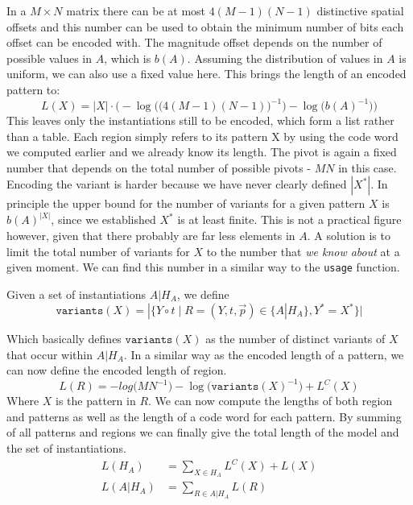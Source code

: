 \documentclass{llncs}
\begin{document}
In a $M\times N$ matrix there can be at most $4(M-1)(N-1)$ distinctive spatial offsets and this number can be used to obtain the minimum number of bits each offset can be encoded with. The magnitude offset depends on the number of possible values in $A$, which is $b(A)$. Assuming the distribution of values in $A$ is uniform, we can also use a fixed value here. This brings the length of an encoded pattern to:
$$
L(X)= |X| \cdot \bigg(-\log\Big(\big(4(M-1)(N-1)\big)^{-1}\Big) -\log\Big(b(A)^{-1}\Big)\bigg)
$$
This leaves only the instantiations still to be encoded, which form a list rather than a table. Each region simply refers to its pattern X by using the code word we computed earlier and we already know its length. The pivot is again a fixed number that depends on the total number of possible pivots - $MN$ in this case. Encoding the variant is harder because we have never clearly defined $|X^*|$. In principle the upper bound for the number of variants for a given pattern $X$ is $b(A)^{|X|}$, since we established $X^*$ is at least finite. This is not a practical figure however, given that there probably are far less elements in $A$. A solution is to limit the total number of variants for $X$ to the number that \emph{we know about} at a given moment. We can find this number in a similar way to the \texttt{usage} function. 
\begin{definition}
Given a set of instantiations $A|H_A$, we define
$$\mathtt{variants}(X) = |\{Y\circ t\mid R=(Y,t,\vec{p}) \in \{A|H_A\}, Y^*=X^*\}|$$
\end{definition}
Which basically defines $\mathtt{variants}(X)$ as the number of distinct variants of $X$ that occur within $A|H_A$. In a similar way as the encoded length of a pattern, we can now define the encoded length of region.
$$
L(R) = -log\big(MN^{-1}\big) -\log\big(\mathtt{variants}(X)^{-1}\big) + L^C(X)
$$
Where $X$ is the pattern in $R$.
We can now compute the lengths of both region and patterns as well as the length of a code word for each pattern. By summing of all patterns and regions we can finally give the total length of the model and the set of instantiations.
\begin{align*}
L(H_A) &= \displaystyle\sum_{X\in H_A} L^C(X) + L(X) \\
L(A|H_A) &= \displaystyle\sum_{R\in A|H_A} L(R)
\end{align*}
\end{document}
